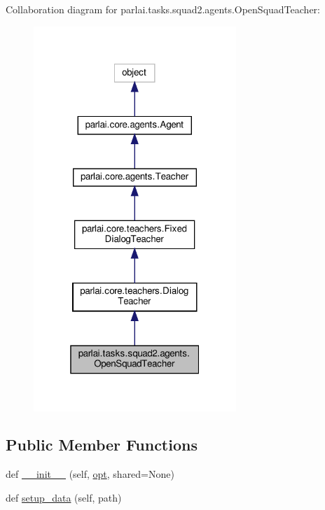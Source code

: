 Collaboration diagram for parlai.\+tasks.\+squad2.\+agents.\+Open\+Squad\+Teacher\+:\nopagebreak
\begin{figure}[H]
\begin{center}
\leavevmode
\includegraphics[width=217pt]{dc/d15/classparlai_1_1tasks_1_1squad2_1_1agents_1_1OpenSquadTeacher__coll__graph}
\end{center}
\end{figure}
\subsection*{Public Member Functions}
\begin{DoxyCompactItemize}
\item 
def \hyperlink{classparlai_1_1tasks_1_1squad2_1_1agents_1_1OpenSquadTeacher_a97032124add4cb349ff65ac04900da82}{\+\_\+\+\_\+init\+\_\+\+\_\+} (self, \hyperlink{classparlai_1_1core_1_1agents_1_1Teacher_a3ce6243860ce978a897922863ed32fa4}{opt}, shared=None)
\item 
def \hyperlink{classparlai_1_1tasks_1_1squad2_1_1agents_1_1OpenSquadTeacher_a7095abdf14125fc5cdae594fb63b71a0}{setup\+\_\+data} (self, path)
\end{DoxyCompactItemize}
